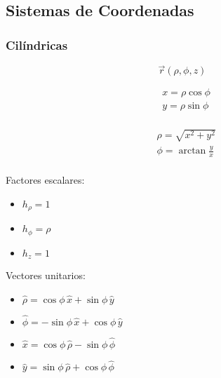 \subsection{Sistemas de Coordenadas}

\subsubsection{Cilíndricas}

\[\Vec{r}(\rho,\phi,z)\]

\begin{minipage}{0.55\textwidth}
\begin{equation}
\begin{split}
    &x = \rho\cos{\phi}\\
    &y = \rho\sin{\phi}\\
\end{split}
\nonumber
\end{equation}
\end{minipage}
\begin{minipage}{0.35\textwidth}
\begin{equation}
\begin{split}
    & \rho = \sqrt{x^2+y^2}\\
    & \phi = \arctan{\frac{y}{x}}\\
\end{split}
\nonumber
\end{equation}
\end{minipage}

\bigbreak
Factores escalares:
\begin{itemize}
    \item $h_\rho = 1$
    \item $h_\phi = \rho$
    \item $h_z = 1$
\end{itemize}

Vectores unitarios:

\begin{itemize}
    \item $\hat{\rho} = \cos{\phi}\,\hat{x}+\sin{\phi}\,\hat{y}$
    \item $\hat{\phi} = -\sin{\phi}\,\hat{x}+\cos{\phi}\,\hat{y}$
    \item $\hat{x}=
    \cos{\phi}\,\hat{\rho}-\sin{\phi}\,\hat{\phi}$
    \item $\hat{y}=
    \sin{\phi}\,\hat{\rho}+\cos{\phi}\,\hat{\phi}$
\end{itemize}

\medbreak

